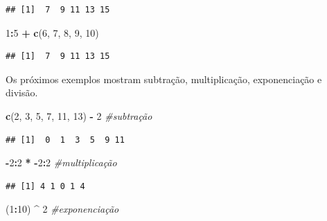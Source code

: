 \documentclass[
]{book}
\newenvironment{Shaded}{\begin{snugshade}}{\end{snugshade}}
\newcommand{\CommentTok}[1]{\textcolor[rgb]{0.56,0.35,0.01}{\textit{#1}}}
\newcommand{\DecValTok}[1]{\textcolor[rgb]{0.00,0.00,0.81}{#1}}
\newcommand{\FunctionTok}[1]{\textcolor[rgb]{0.13,0.29,0.53}{\textbf{#1}}}
\newcommand{\NormalTok}[1]{#1}
\newcommand{\SpecialCharTok}[1]{\textcolor[rgb]{0.81,0.36,0.00}{\textbf{#1}}}
\begin{document}
\begin{verbatim}
## [1]  7  9 11 13 15
\end{verbatim}

\begin{Shaded}
\begin{Highlighting}[]
\DecValTok{1}\SpecialCharTok{:}\DecValTok{5} \SpecialCharTok{+} \FunctionTok{c}\NormalTok{(}\DecValTok{6}\NormalTok{, }\DecValTok{7}\NormalTok{, }\DecValTok{8}\NormalTok{, }\DecValTok{9}\NormalTok{, }\DecValTok{10}\NormalTok{)}
\end{Highlighting}
\end{Shaded}

\begin{verbatim}
## [1]  7  9 11 13 15
\end{verbatim}

Os próximos exemplos mostram subtração, multiplicação, exponenciação e divisão.

\begin{Shaded}
\begin{Highlighting}[]
\FunctionTok{c}\NormalTok{(}\DecValTok{2}\NormalTok{, }\DecValTok{3}\NormalTok{, }\DecValTok{5}\NormalTok{, }\DecValTok{7}\NormalTok{, }\DecValTok{11}\NormalTok{, }\DecValTok{13}\NormalTok{) }\SpecialCharTok{{-}} \DecValTok{2}       \CommentTok{\#subtração}
\end{Highlighting}
\end{Shaded}

\begin{verbatim}
## [1]  0  1  3  5  9 11
\end{verbatim}

\begin{Shaded}
\begin{Highlighting}[]
\SpecialCharTok{{-}}\DecValTok{2}\SpecialCharTok{:}\DecValTok{2} \SpecialCharTok{*} \SpecialCharTok{{-}}\DecValTok{2}\SpecialCharTok{:}\DecValTok{2}                     \CommentTok{\#multiplicação}
\end{Highlighting}
\end{Shaded}

\begin{verbatim}
## [1] 4 1 0 1 4
\end{verbatim}

\begin{Shaded}
\begin{Highlighting}[]
\NormalTok{(}\DecValTok{1}\SpecialCharTok{:}\DecValTok{10}\NormalTok{) }\SpecialCharTok{\^{}} \DecValTok{2}                        \CommentTok{\#exponenciação}
\end{Highlighting}
\end{Shaded}
\end{document}
